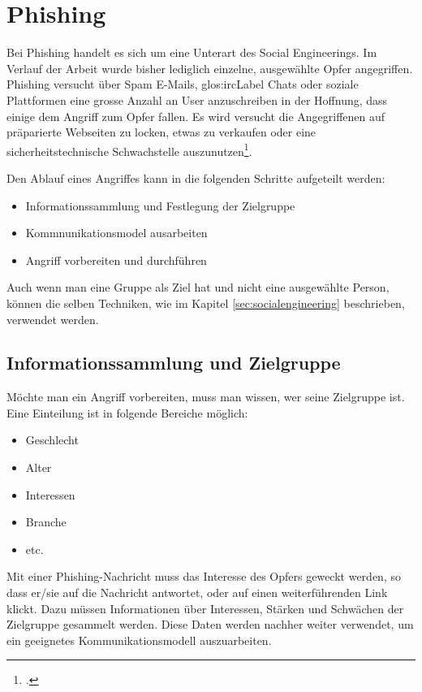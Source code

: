 \setcounter{secnumdepth}{3}
\chapter{Phishing}
Bei Phishing handelt es sich um eine Unterart des Social Engineerings. Im Verlauf der Arbeit wurde bisher lediglich einzelne, ausgewählte Opfer angegriffen.
Phishing versucht über Spam E-Mails, \Gls{glos:ircLabel} Chats oder soziale Plattformen eine grosse Anzahl an User anzuschreiben in der Hoffnung, dass einige dem Angriff zum Opfer fallen. Es wird versucht die Angegriffenen auf präparierte Webseiten zu locken, etwas zu verkaufen oder eine sicherheitstechnische Schwachstelle auszunutzen\footcite{MELANI_-_Phishing_2015-06-29}.

Den Ablauf eines Angriffes kann in die folgenden Schritte aufgeteilt werden:
\begin{itemize}
\item Informationssammlung und Festlegung der Zielgruppe
\item Kommnunikationsmodel ausarbeiten
\item Angriff vorbereiten und durchführen
\end{itemize}

Auch wenn man eine Gruppe als Ziel hat und nicht eine ausgewählte Person, können die selben Techniken, wie im Kapitel \ref{sec:socialengineering}  beschrieben, verwendet werden.

\section{Informationssammlung und Zielgruppe}
Möchte man ein Angriff vorbereiten, muss man wissen, wer seine Zielgruppe ist. Eine Einteilung ist in folgende Bereiche möglich:
\begin{itemize}
\item Geschlecht
\item Alter
\item Interessen
\item Branche
\item etc.
\end{itemize}

Mit einer Phishing-Nachricht muss das Interesse des Opfers geweckt werden, so dass er/sie auf die Nachricht antwortet, oder auf einen weiterführenden Link klickt. Dazu müssen Informationen über Interessen, Stärken und Schwächen der Zielgruppe gesammelt werden. Diese Daten werden nachher weiter verwendet, um ein geeignetes Kommunikationsmodell auszuarbeiten.


